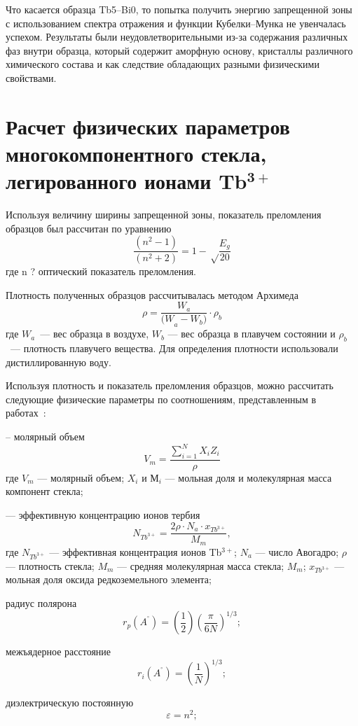 \documentclass[press]{vestnik}
\begin{document}
Что касается образца Tb5--Bi0, то попытка получить энергию запрещенной зоны с 
использованием спектра отражения и функции Кубелки--Мунка не увенчалась 
успехом. Результаты были неудовлетворительными из-за содержания различных 
фаз внутри образца, который содержит аморфную основу, кристаллы различного 
химического состава и как следствие обладающих разными физическими 
свойствами.

\section{Расчет физических параметров многокомпонентного стекла, легированного ионами Tb$^\mathbf{3+}$}

Используя величину ширины запрещенной зоны, показатель преломления образцов 
был рассчитан по уравнению~\cite{B17}
\[
\frac{\left( n^{2}-1 \right)}{\left( n^{2}+2 \right)}=1-\sqrt 
\frac{E_{g}}{20} 
\]
где n ? оптический показатель преломления.

Плотность полученных образцов рассчитывалась методом Архимеда
\[
\rho =\frac{W_{a}}{{(W}_{a}-W_{b})}\cdot \rho_{b}
\]
где $W_{a}$~--- вес образца в воздухе, $W_{b}$ --- вес образца в плавучем 
состоянии и $\rho_{b}$~--- плотность плавучего вещества. Для определения 
плотности использовали дистиллированную воду.

Используя плотность и показатель преломления образцов, можно рассчитать 
следующие физические параметры по соотношениям, представленным в работах~\cite{B18,B19}:

\noindent
-- молярный объем
\[
V_{m} =\frac{\sum\limits_{i=1}^N {X_{i}Z_{i}} }{\rho }
\]
где $V_{m}$ --- молярный объем; $X_{i}$ и $М_{i}$ --- мольная доля и 
молекулярная масса компонент стекла;

\noindent
--- эффективную концентрацию ионов тербия
\[
N_{{Tb}^{3+}}=\frac{2\rho \cdot N_{a}\cdot x_{{Tb}^{3+}}}{M_{m}},
\]
где $N_{{Tb}^{3+}}$ --- эффективная концентрация ионов Tb$^{3+}$; $N_{a}$ 
--- число Авогадро; $\rho $ --- плотность стекла; $M_{m}$ --- средняя 
молекулярная масса стекла; $M_{m}$; $x_{{Tb}^{3+}}$ --- мольная доля оксида 
редкоземельного элемента;

\noindent
радиус полярона
\[
r_{p}(A^{^{\circ}})=\left(\frac{1}{2}\right)\left(\frac{\pi }{6N}\right)^{1/3};
\]

\noindent
межъядерное расстояние
\[
r_{i}\left( A^{^{\circ}} \right)=\left(\frac{1}{N}\right)^{1/3};
\]

\noindent
диэлектрическую постоянную
\[
\varepsilon =n^{2};
\]
\end{document}

